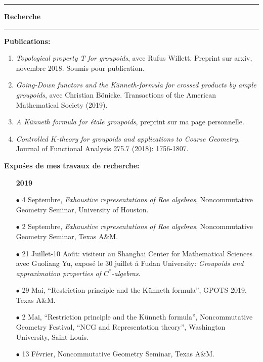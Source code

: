 \documentclass[a4paper,11pt]{article}
\newcommand\espace{\vrule height 20pt width 0pt}
\newcommand{\titre}[1]{%
	\begin{center}
	\bigskip
	\rule{\textwidth}{1pt}
	\par\vspace{0.1cm}
        \textbf{\large #1}
	\par\rule{\textwidth}{1pt}
	\end{center}
	\bigskip
	}
\begin{document}
\newpage
\titre{Recherche}

\textbf{Publications:} 
\begin{enumerate}
\item \textit{Topological property T for groupoids}, avec Rufus Willett. Preprint sur arxiv, novembre 2018. Soumis pour publication.
\item \textit{Going-Down functors and the Künneth-formula for crossed products by ample groupoids}, avec Christian Bönicke. Transactions of the American Mathematical Society (2019).
\item \textit{A K\"{u}nneth formula for \'etale groupoids}, preprint sur ma page personnelle.
\item \textit{Controlled $K$-theory for groupoids and applications to Coarse Geometry}, Journal of Functional Analysis 275.7 (2018): 1756-1807.
\end{enumerate}
\espace


\textbf{Expo\'ses de mes travaux de recherche:}\\

\begin{itemize}
\item[\textbf{2019}]
\item[$\bullet$] 4 Septembre, \textit{Exhaustive representations of Roe algebras}, Noncommutative Geometry Seminar, University of Houston.
\item[$\bullet$] 2 Septembre, \textit{Exhaustive representations of Roe algebras}, Noncommutative Geometry Seminar, Texas A\&M. 
\item[$\bullet$] 21 Juillet-10 Ao\^{u}t: visiteur au Shanghai Center for Mathematical Sciences avec Guoliang Yu, expos\'e le 30 juillet \'a Fudan University: \textit{Groupoids and approximation properties of $C^*$-algebras}. 
\item[$\bullet$] 29 Mai, ``Restriction principle and the Künneth formula'', GPOTS 2019, Texas A\&M.
\item[$\bullet$] 2 Mai, ``Restriction principle and the Künneth formula'', Noncommutative Geometry Festival, ``NCG and Representation theory'', Washington University, Saint-Louis.
\item[$\bullet$] 13 F\'evrier, Noncommutative Geometry Seminar, Texas A\&M.
\end{itemize}
\end{document}
